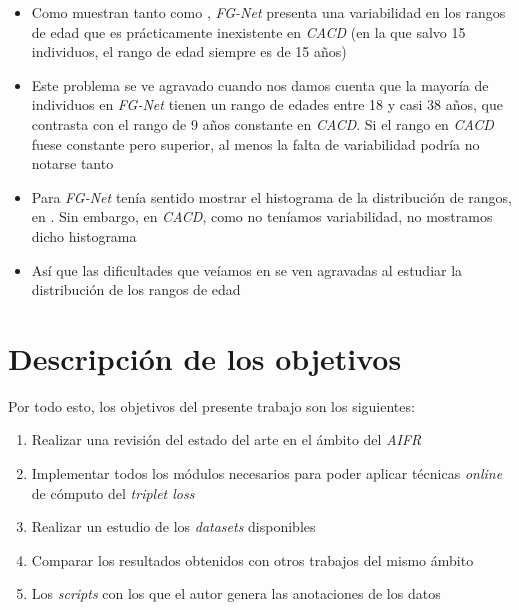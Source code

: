 \begin{itemize}
    \item Como muestran tanto  como , \textit{FG-Net} presenta una variabilidad en los rangos de edad que es prácticamente inexistente en \textit{CACD} (en la que salvo 15 individuos, el rango de edad siempre es de 15 años)
    \item Este problema se ve agravado cuando nos damos cuenta que la mayoría de individuos en \textit{FG-Net} tienen un rango de edades entre 18 y casi 38 años, que contrasta con el rango de 9 años constante en \textit{CACD}. Si el rango en \textit{CACD} fuese constante pero superior, al menos la falta de variabilidad podría no notarse tanto
    \item Para \textit{FG-Net} tenía sentido mostrar el histograma de la distribución de rangos, en . Sin embargo, en \textit{CACD}, como no teníamos variabilidad, no mostramos dicho histograma
    \item Así que las dificultades que veíamos en  se ven agravadas al estudiar la distribución de los rangos de edad
\end{itemize}

\section{Descripción de los objetivos}

Por todo esto, los objetivos del presente trabajo son los siguientes:

\begin{enumerate}
    \item Realizar una revisión del estado del arte en el ámbito del \textit{AIFR}
    \item Implementar todos los módulos necesarios para poder aplicar técnicas \textit{online} de cómputo del \textit{triplet loss}
    \item Realizar un estudio de los \textit{datasets} disponibles
    \item Comparar los resultados obtenidos con otros trabajos del mismo ámbito
    \item Los \textit{scripts} con los que el autor genera las anotaciones de los datos
\end{enumerate}

